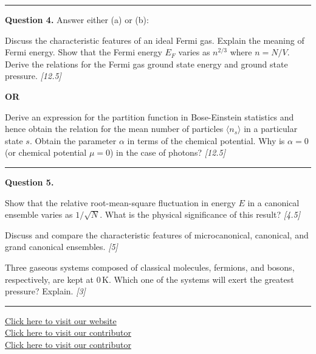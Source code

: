 \documentclass[11pt,a4paper]{article}
\newcommand{\pts}[1]{\hfill   \textit{[#1]}}
\begin{document}
\medskip\rule{\linewidth}{0.2pt}




\noindent   \textbf{Question 4.} Answer either (a) or (b):

\begin{parts}
  \item Discuss the characteristic features of an ideal Fermi gas. Explain the meaning of Fermi energy. Show that the Fermi energy $E_F$ varies as $n^{2/3}$ where $n = N/V$. Derive the relations for the Fermi gas ground state energy and ground state pressure. \pts{12.5}
\end{parts}
\hfill   \textbf{OR}

\begin{parts}
  \item Derive an expression for the partition function in Bose-Einstein statistics and hence obtain the relation for the mean number of particles $\langle n_s \rangle$ in a particular state $s$. Obtain the parameter $\alpha$ in terms of the chemical potential. Why is $\alpha = 0$ (or chemical potential $\mu = 0$) in the case of photons? \pts{12.5}
\end{parts}

\medskip\rule{\linewidth}{0.2pt}




\noindent   \textbf{Question 5.}

\begin{parts}
  \item Show that the relative root-mean-square fluctuation in energy $E$ in a canonical ensemble varies as $1/\sqrt{N}$. What is the physical significance of this result? \pts{4.5}
  \item Discuss and compare the characteristic features of microcanonical, canonical, and grand canonical ensembles. \pts{5}
  \item Three gaseous systems composed of classical molecules, fermions, and bosons, respectively, are kept at $0\, \text{K}$. Which one of the systems will exert the greatest pressure? Explain. \pts{3}
\end{parts}

\vfill
\rule{\linewidth}{0.4pt}

\begin{center}\small
  \href{https://bhu-exam.vercel.app/}{Click here to visit our website}\\[4pt]
  \href{https://me-aryan.vercel.app/}{Click here to visit our contributor}\\[4pt]
  \href{https://quashan-me.vercel.app/}{Click here to visit our contributor}
\end{center}
\end{document}
